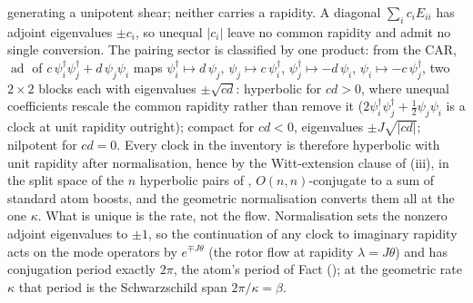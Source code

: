 generating a unipotent shear; neither carries a rapidity. A diagonal $\sum_i c_i E_{ii}$ has adjoint eigenvalues $\pm c_i$, so unequal $|c_i|$ leave no common rapidity and admit no single conversion. The pairing sector is classified by one product: from the CAR, $\operatorname{ad}$ of $c\,\psi_i^\dagger\psi_j^\dagger + d\,\psi_j\psi_i$ maps $\psi_i^\dagger \mapsto d\,\psi_j$, $\psi_j \mapsto c\,\psi_i^\dagger$, $\psi_j^\dagger \mapsto -d\,\psi_i$, $\psi_i \mapsto -c\,\psi_j^\dagger$, two $2 \times 2$ blocks each with eigenvalues $\pm\sqrt{cd}$: hyperbolic for $cd > 0$, where unequal coefficients rescale the common rapidity rather than remove it ($2\psi_i^\dagger\psi_j^\dagger + \tfrac12\psi_j\psi_i$ is a clock at unit rapidity outright); compact for $cd < 0$, eigenvalues $\pm J\sqrt{|cd|}$; nilpotent for $cd = 0$. Every clock in the inventory is therefore hyperbolic with unit rapidity after normalisation, hence by the Witt-extension clause of (iii), in the split space of the $n$ hyperbolic pairs of , $O(n,n)$-conjugate to a sum of standard atom boosts, and the geometric normalisation converts them all at the one $\kappa$. What is unique is the rate, not the flow. Normalisation sets the nonzero adjoint eigenvalues to $\pm 1$, so the continuation of any clock to imaginary rapidity acts on the mode operators by $e^{\mp J\theta}$ (the rotor flow at rapidity $\lambda = J\theta$) and has conjugation period exactly $2\pi$, the atom's period of Fact  (\cite[Prop.~7.21(1)]{ButlerT5}); at the geometric rate $\kappa$ that period is the Schwarzschild span $2\pi/\kappa = \beta$.
